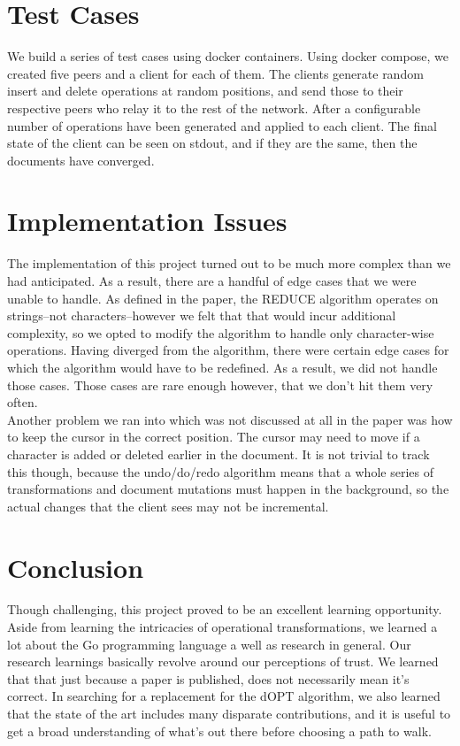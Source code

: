 \documentclass{article}
\begin{document}
\section{Test Cases}
We build a series of test cases using docker containers. Using docker compose, we created five peers and a client for each of them. The clients generate random insert and delete operations at random positions, and send those to their respective peers who relay it to the rest of the network. After a configurable number of operations have been generated and applied to each client. The final state of the client can be seen on stdout, and if they are the same, then the documents have converged.\\

\section{Implementation Issues}
The implementation of this project turned out to be much more complex than we had anticipated. As a result, there are a handful of edge cases that we were unable to handle. As defined in the paper, the REDUCE algorithm operates on strings--not characters--however we felt that that would incur additional complexity, so we opted to modify the algorithm to handle only character-wise operations. Having diverged from the algorithm, there were certain edge cases for which the algorithm would have to be redefined. As a result, we did not handle those cases. Those cases are rare enough however, that we don't hit them very often.\\

Another problem we ran into which was not discussed at all in the paper was how to keep the cursor in the correct position. The cursor may need to move if a character is added or deleted earlier in the document. It is not trivial to track this though, because the undo/do/redo algorithm means that a whole series of transformations and document mutations must happen in the background, so the actual changes that the client sees may not be incremental.\\

\section{Conclusion}
Though challenging, this project proved to be an excellent learning opportunity. Aside from learning the intricacies of operational transformations, we learned a lot about the Go programming language a well as research in general. Our research learnings basically revolve around our perceptions of trust. We learned that that just because a paper is published, does not necessarily mean it's correct. In searching for a replacement for the dOPT algorithm, we also learned that the state of the art includes many disparate contributions, and it is useful to get a broad understanding of what's out there before choosing a path to walk.\\
\end{document}
